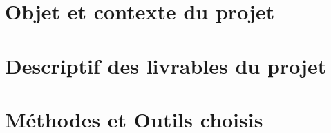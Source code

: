 

\newcommand{\mainTitle}{\'Etude préalable - SPIE}
\newcommand{\secondTitle}{Dossier d'Initialisation}
\newcommand{\documentRef}{DI/4401/1}





\tableofcontents
\listoffigures
\newpage


%


\part{Objet et contexte du projet}
\setcounter{section}{0}

\part{Descriptif des livrables du projet}
\setcounter{section}{0}

\part{Méthodes et Outils choisis}
\setcounter{section}{0}

